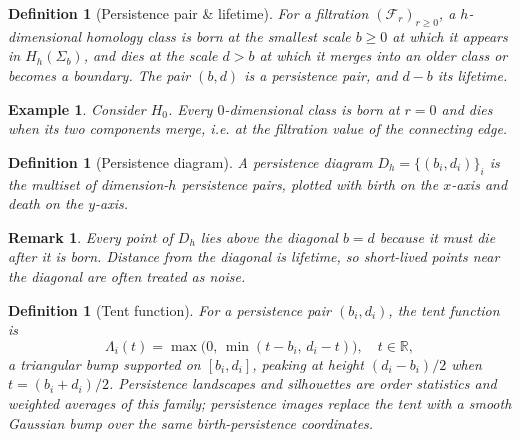 \documentclass[11pt,letterpaper]{article}
\newcommand{\R}{\mathbb{R}}
\newcommand{\1}{\mathds{1}}
\newcommand{\simpcom}{\Sigma}
\newcommand{\filt}{\mathcal{F}}
\theoremstyle{plain}
\theoremstyle{definitioncolon}
\newtheorem{definition}[theorem]{Definition}
\newtheorem*{example}{Example}
\newtheorem*{remark}{Remark}
\begin{document}
    \begin{definition}[Persistence pair \& lifetime]
        For a filtration $(\filt_r)_{r \geq 0}$, a $h$-dimensional homology
        class is \emph{born} at the smallest scale $b \geq 0$ at which it
        appears in $H_h(\simpcom_b)$, and \emph{dies} at the scale $d > b$ at
        which it merges into an older class or becomes a boundary. The pair
        $(b,d)$ is a \emph{persistence pair}, and $d - b$ its \emph{lifetime}.
    \end{definition}

    \begin{example}
        Consider $H_0$. Every $0$-dimensional class is born at $r=0$ and dies
        when its two components merge, i.e. at the filtration value of the
        connecting edge.
    \end{example}

    \begin{definition}[Persistence diagram]
        A persistence diagram $D_h = \{(b_i, d_i)\}_i$ is the multiset of
        dimension-$h$ persistence pairs, plotted with birth on the $x$-axis and
        death on the $y$-axis.
    \end{definition}

    \begin{remark}
        Every point of $D_h$ lies above the diagonal $b=d$ because it must die
        after it is born. Distance from the diagonal is lifetime, so short-lived
        points near the diagonal are often treated as noise.
    \end{remark}

    \begin{definition}[Tent function]
    \label{def:tent}
        For a persistence pair $(b_i, d_i)$, the tent function is
            \[
            \Lambda_i(t) = \max\bigl(0,\, \min(t - b_i,\, d_i - t)\bigr),
            \quad t \in \R,
            \]
        a triangular bump supported on $[b_i, d_i]$, peaking at height
        $(d_i-b_i)/2$ when $t = (b_i+d_i)/2$. Persistence landscapes and
        silhouettes are order statistics and weighted averages of this family;
        persistence images replace the tent with a smooth Gaussian bump over
        the same birth-persistence coordinates.
    \end{definition}
\end{document}
